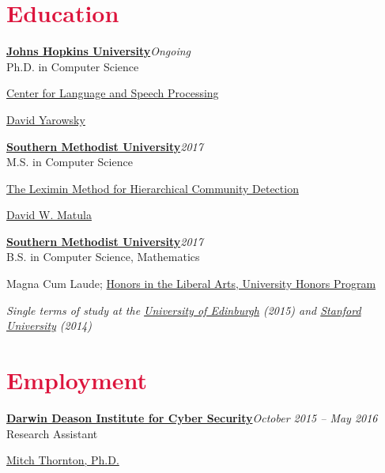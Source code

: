\documentclass[margin, 10pt]{res} %
\newcommand{\Year}[1]{\emph{#1}}
\newcommand{\uni}[1]{\textbf{#1}}
\newcommand{\eventYear}[2]{\uni{#1}\hfill{\Year{#2}}\\}
\let\oldsection\section
\renewcommand{\section}[1]{\oldsection{\textcolor{crimson}{#1}}}
\newcommand{\JHU}{\href{https://www.jhu.edu/}{Johns Hopkins University}}
\newcommand{\SMU}{\href{https://www.smu.edu/}{Southern Methodist University}}
\newcommand{\HPHS}{\href{http://hs.hpisd.org}{Highland Park High School}}
\newcommand{\STAN}{\href{https://www.stanford.edu/}{Stanford University}}
\newcommand{\UOE}{\href{https://www.ed.ac.uk/}{University of Edinburgh}}
\newcommand{\CLSP}{\href{https://www.clsp.jhu.edu}{Center for Language and Speech Processing}}
\begin{document}
\begin{resume}
\section{Education}

\eventYear{\JHU}{Ongoing}
	Ph.D. in Computer Science
	\begin{description}[noitemsep, labelindent=1em]
	\item[Affiliation:] \CLSP
	\item[Advisor:] \href{http://www.cs.jhu.edu/~yarowsky/}{David Yarowsky}
	\end{description}

\eventYear{\SMU}{2017}
	M.S. in Computer Science
	\begin{description}[noitemsep, labelindent=1em]
	\item[Thesis:] \href{https://search.proquest.com/docview/1907180434?pq-origsite=gscholar}{The Leximin Method for Hierarchical Community Detection}
	\item[Advisor:] \href{https://lyle.smu.edu/~matula/}{David W. Matula}
	\end{description}
 
\eventYear{\SMU}{2017}
	B.S. in Computer Science, Mathematics
	\begin{description}[noitemsep, labelindent=0.5em]
	\item Magna Cum Laude; \href{http://www.smu.edu/dedman/studentresources/universityhonors}{Honors in the Liberal Arts, University Honors Program}
	\end{description}
	
	
\emph{Single terms of study at the \UOE{} (2015) and \STAN{} (2014)}



\section{Employment}

\begin{samepage}
\eventYear{\href{https://www.smu.edu/Lyle/Institutes/DeasonInstitute}{Darwin Deason Institute for Cyber Security}}{October 2015 -- May 2016}
Research Assistant
\begin{description}[nosep]
\item[Host:] \href{https://s2.smu.edu/~mitch/}{Mitch Thornton, Ph.D.}
\end{description}
\end{samepage}


\end{resume}
\end{document}

